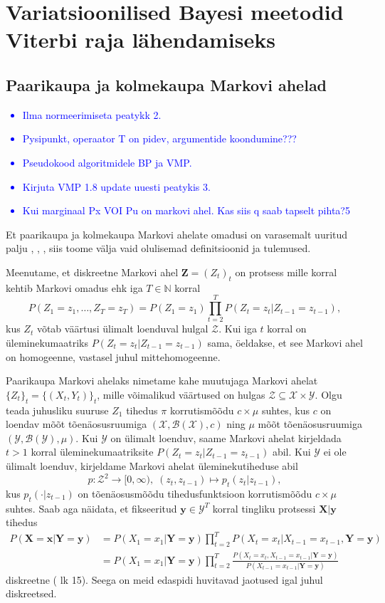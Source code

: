 \section{Variatsioonilised Bayesi meetodid Viterbi raja lähendamiseks}
\subsection{Paarikaupa ja kolmekaupa Markovi ahelad}
\textcolor{blue}{
\begin{itemize}
\item Ilma normeerimiseta peatykk 2.
\item Pysipunkt, operaator T on pidev, argumentide koondumine???
\item Pseudokood algoritmidele BP ja VMP.
\item Kirjuta VMP 1.8 update uuesti peatykis 3.
\item Kui marginaal Px VOI Pu on markovi ahel. Kas siis q saab tapselt pihta?5
\end{itemize}
}
Et paarikaupa ja kolmekaupa Markovi ahelate omadusi on varasemalt uuritud palju \parencite{kuljus2022hybridclassifierspairwisemarkov}, \parencite{Soop.2023}, \parencite{Avans.2021}, siis toome välja vaid olulisemad definitsioonid ja tulemused.

Meenutame, et diskreetne Markovi ahel $\bm{Z} = (Z_t)_{t}$ on protsess mille korral kehtib Markovi omadus ehk iga $T \in \mathbb{N}$ korral
$$P(Z_1=z_1,\ldots,Z_T=z_T) = P(Z_1=z_1)\prod_{t=2}^T P(Z_t=z_t | Z_{t-1} = z_{t-1}),$$ 
kus $Z_t$ võtab väärtusi ülimalt loenduval hulgal $\mathcal{Z}$. Kui iga $t$ korral on üleminekumaatriks $P(Z_t=z_t | Z_{t-1} = z_{t-1})$ sama, öeldakse, et see Markovi ahel on  homogeenne, vastasel juhul mittehomogeenne.

Paarikaupa Markovi ahelaks nimetame kahe muutujaga Markovi ahelat $\{Z_t\}_{t} = \{(X_t,Y_t)\}_{t}$, mille võimalikud väärtused on hulgas $\mathcal{Z} \subseteq \mathcal{X} \times \mathcal{Y}$. Olgu teada juhusliku suuruse $Z_1$ tihedus $\pi$ korrutismõõdu $c \times \mu$ suhtes, kus $c$ on loendav mõõt tõenäosusruumiga $(\mathcal{X}, \mathcal{B}(\mathcal{X}),c) $ ning $\mu$ mõõt tõenäosusruumiga $(\mathcal{Y}, \mathcal{B}(\mathcal{Y}),\mu)$. Kui $\mathcal{Y}$ on ülimalt loenduv, saame Markovi ahelat kirjeldada $t>1$ korral üleminekumaatriksite $P(Z_t = z_t|Z_{t-1} = z_{t-1})$ abil. Kui $\mathcal{Y}$ ei ole ülimalt loenduv, kirjeldame Markovi ahelat üleminekutiheduse abil
$$p: \mathcal{Z}^2 \rightarrow [0,\infty),\; (z_t,z_{t-1}) \mapsto p_t(z_t|z_{t-1}),$$
kus $p_t(\cdot|z_{t-1})$ on tõenäosusmõõdu tihedusfunktsioon korrutismõõdu $c \times \mu$ suhtes. Saab aga näidata, et fikseeritud $\bm{y} \in \mathcal{Y}^T$ korral tingliku protsessi $\bm{X}|\bm{y}$ tihedus
\begin{align*}
    P(\bm{X} = \bm{x}|\bm{Y}=\bm{y}) &= P(X_1 = x_1|\bm{Y}=\bm{y}) \prod_{t=2}^T P(X_t = x_t|X_{t-1} = x_{t-1}, \bm{Y}=\bm{y})\\
    &= P(X_1 = x_1|\bm{Y}=\bm{y}) \prod_{t=2}^T \frac{P(X_t = x_t, X_{t-1} = x_{t-1} |\bm{Y}= \bm{y})}{P(X_{t-1} = x_{t-1} | \bm{Y}=\bm{y})}
\end{align*}
diskreetne (\cite{Avans.2021} lk 15). Seega on meid edaspidi huvitavad jaotused igal juhul diskreetsed.


